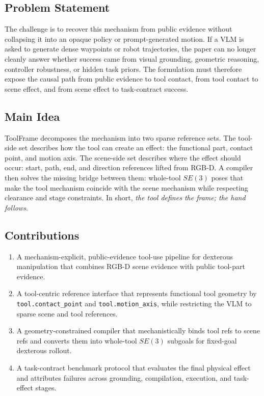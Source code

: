 \documentclass[journal]{IEEEtran}
\newcommand{\method}{ToolFrame}
\begin{document}
\subsection{Problem Statement}
The challenge is to recover this mechanism from public evidence without
collapsing it into an opaque policy or prompt-generated motion. If a VLM is
asked to generate dense waypoints or robot trajectories, the paper can no
longer cleanly answer whether success came from visual grounding, geometric
reasoning, controller robustness, or hidden task priors. The formulation must
therefore expose the causal path from public evidence to tool contact, from
tool contact to scene effect, and from scene effect to task-contract success.

\subsection{Main Idea}
\method{} decomposes the mechanism into two sparse reference sets. The
tool-side set describes how the tool can create an effect: the functional part,
contact point, and motion axis. The scene-side set describes where the effect
should occur: start, path, end, and direction references lifted from RGB-D. A
compiler then solves the missing bridge between them: whole-tool $SE(3)$ poses
that make the tool mechanism coincide with the scene mechanism while respecting
clearance and stage constraints. In short, \emph{the tool defines the frame;
the hand follows}.

\subsection{Contributions}
\begin{enumerate}
  \item A mechanism-explicit, public-evidence tool-use pipeline for dexterous
  manipulation that combines RGB-D scene evidence with public tool-part
  evidence.
  \item A tool-centric reference interface that represents functional tool
  geometry by \texttt{tool.contact\_point} and
  \texttt{tool.motion\_axis}, while restricting the VLM to sparse scene and
  tool references.
  \item A geometry-constrained compiler that mechanistically binds tool refs to
  scene refs and converts them into whole-tool $SE(3)$ subgoals for fixed-goal
  dexterous rollout.
  \item A task-contract benchmark protocol that evaluates the final physical
  effect and attributes failures across grounding, compilation, execution, and
  task-effect stages.
\end{enumerate}
\end{document}
